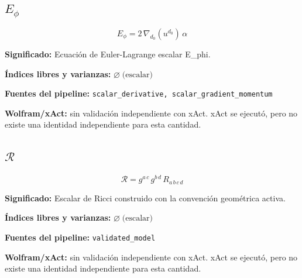 \documentclass[11pt]{article}
\begin{document}
\subsection*{$ E_{\phi} $}
\begin{dmath*}[breakdepth={5}]
E_{\phi} = 2\,\nabla_{d_{0}}\!\left(u{}^{d_{0}}\right)\,\alpha
\end{dmath*}
\par\vspace{1.2\baselineskip}\noindent
\begin{minipage}{\linewidth}
\textbf{Significado:} Ecuación de Euler-Lagrange escalar E\_phi.\par
\textbf{Índices libres y varianzas:} $ \varnothing\;\text{(escalar)} $\par
\textbf{Fuentes del pipeline:} \texttt{scalar\_derivative, scalar\_gradient\_momentum}\par
\textbf{Wolfram/xAct:} sin validación independiente con xAct. xAct se ejecutó, pero no existe una identidad independiente para esta cantidad.\par
\end{minipage}
\subsection*{$ \mathcal{R} $}
\begin{dmath*}[breakdepth={5}]
\mathcal{R} = g{}^{a\,c}\,g{}^{b\,d}\,R{}_{a\,b\,c\,d}
\end{dmath*}
\par\vspace{1.2\baselineskip}\noindent
\begin{minipage}{\linewidth}
\textbf{Significado:} Escalar de Ricci construido con la convención geométrica activa.\par
\textbf{Índices libres y varianzas:} $ \varnothing\;\text{(escalar)} $\par
\textbf{Fuentes del pipeline:} \texttt{validated\_model}\par
\textbf{Wolfram/xAct:} sin validación independiente con xAct. xAct se ejecutó, pero no existe una identidad independiente para esta cantidad.\par
\end{minipage}
\end{document}
